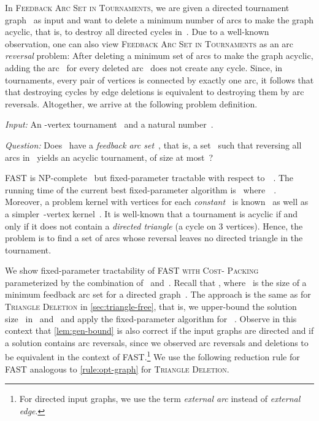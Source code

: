 \documentclass[envcountsame,numbook,smallextended]{svjour3}
\numberwithin{equation}{section}
\numberwithin{figure}{section}
\newcommand{\decprob}[3]{\pagebreak[3]
  \begin{problem}[\boldmath#1]
    \begin{compactdesc}
        \item[\normalfont\it Input:] #2
        \item[\normalfont\it Question:] #3
    \end{compactdesc}
  \end{problem}
}
\newcommand{\FAST}{\textsc{Feedback Arc Set in Tournaments}}
\begin{document}
In \textsc{Feedback Arc Set in Tournaments}, we are given a directed tournament graph~
as input and want to delete a minimum number of arcs to make the graph acyclic, that is, to destroy all directed cycles
in~. Due to a well-known observation, one can also view \textsc{Feedback Arc Set in Tournaments} as an arc \emph{reversal} problem: After deleting a minimum set of arcs to make the graph acyclic, adding the
arc~ for every deleted arc~ does not create any cycle. Since, in
tournaments, every pair of vertices is connected by exactly one arc, it follows that that
destroying cycles by edge deletions is equivalent to destroying them by arc
reversals. Altogether, we arrive at the following problem definition. 
\decprob{\FAST{} (\textsc{FAST})}
{An -vertex tournament~ and a natural number~.}
{Does~ have a \emph{feedback arc set}~, that is, a set~ such that reversing all arcs in~ yields an acyclic tournament, of size at most~?}
\textsc{FAST} is NP-complete~\cite{Alon06} but fixed-parameter
tractable with respect to~~\cite{RS06, DGHNT06, ALS09,Fei09,KS10,FP13}. The running
time of the current best fixed-parameter algorithm is~ where~~\cite{FP13}.
Moreover, a problem kernel with  vertices
for each \emph{constant}~ is known~\cite{BFGPPST11}
as well as a simpler~-vertex kernel~\cite{PPT16}.
It is well-known that a tournament is acyclic if
and only if it does not contain a \emph{directed triangle} (a cycle on 3
vertices). Hence, the problem is to find a set of arcs whose reversal
leaves no directed triangle in the tournament.

We show fixed-parameter tractability of FAST\textsc{ with Cost- Packing} parameterized by the combination of~ and~. Recall that , where~ is the size of a minimum feedback arc set for a directed graph~.
The approach is the same as for \textsc{Triangle Deletion} in \cref{sec:triangle-free}, that is, we upper-bound the solution size~ in~ and~ and apply the fixed-parameter algorithm for~ \cite{KS10}. Observe in this context that \cref{lem:gen-bound} is also correct if the input graphs are directed and if a solution contains arc reversals, since we observed arc reversals and deletions to be equivalent in the context of \textsc{FAST}.\footnote{For directed input graphs, we use the term \emph{external arc} instead of \emph{external edge}.}
We use the following reduction rule for \textsc{FAST} analogous to \cref{rule:opt-graph} for \textsc{Triangle Deletion}.

\end{document}
